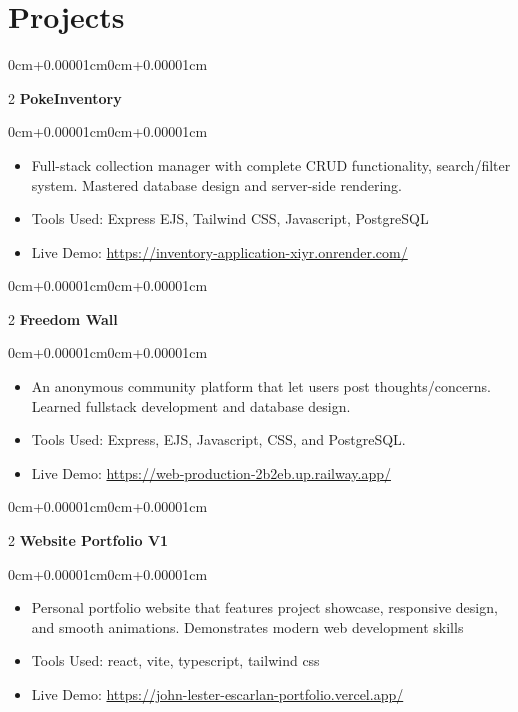 \documentclass[10pt, letterpaper]{article}
\newenvironment{highlights}{\begin{itemize}[topsep=0.10cm,parsep=0.10cm,partopsep=0pt,itemsep=0pt,leftmargin=0cm+10pt]}{\end{itemize}}
\newenvironment{onecolentry}{\begin{adjustwidth}{0cm+0.00001cm}{0cm+0.00001cm}}{\end{adjustwidth}}
\newenvironment{twocolentry}[2][]{\onecolentry\def\secondColumn{#2}\setcolumnwidth{\fill,8cm}\begin{paracol}{2}}{\switchcolumn \raggedleft \secondColumn\end{paracol}\endonecolentry}
\begin{document}
\section{Projects}

    \begin{twocolentry}{2025}
      \textbf{PokeInventory}\end{twocolentry}
    \vspace{0.10cm}
    \begin{onecolentry}
      \begin{highlights}
        \item Full-stack collection manager with complete CRUD functionality, search/filter system. Mastered database design and server-side rendering.
        \item Tools Used: Express EJS, Tailwind CSS, Javascript, PostgreSQL
        \item Live Demo: \href{https://inventory-application-xiyr.onrender.com/}{https://inventory-application-xiyr.onrender.com/}
      \end{highlights}
    \end{onecolentry}
    \vspace{0.15cm}
  

    \begin{twocolentry}{2025}
      \textbf{Freedom Wall}\end{twocolentry}
    \vspace{0.10cm}
    \begin{onecolentry}
      \begin{highlights}
        \item An anonymous community platform that let users post thoughts/concerns. Learned fullstack development and database design.
        \item Tools Used: Express, EJS, Javascript, CSS, and PostgreSQL.
        \item Live Demo: \href{https://web-production-2b2eb.up.railway.app/}{https://web-production-2b2eb.up.railway.app/}
      \end{highlights}
    \end{onecolentry}
    \vspace{0.15cm}
  

    \begin{twocolentry}{2025}
      \textbf{Website Portfolio V1}\end{twocolentry}
    \vspace{0.10cm}
    \begin{onecolentry}
      \begin{highlights}
        \item Personal portfolio website that features project showcase, responsive design, and smooth animations. Demonstrates modern web development skills
        \item Tools Used: react, vite, typescript, tailwind css
        \item Live Demo: \href{https://john-lester-escarlan-portfolio.vercel.app/}{https://john-lester-escarlan-portfolio.vercel.app/}
      \end{highlights}
    \end{onecolentry}
    \vspace{0.15cm}
  
\end{document}
